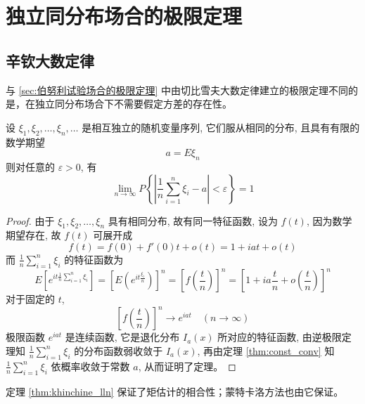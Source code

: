 \section{独立同分布场合的极限定理}\label{sec:独立同分布场合的极限定理}
\subsection{辛钦大数定律}\label{subsec:辛钦大数定律}
与 \ref{sec:伯努利试验场合的极限定理} 中由切比雪夫大数定律建立的极限定理不同的是，在独立同分布场合下不需要假定方差的存在性。
\begin{theorem} \label{thm:khinchine_lln}
 设 $\xi_1, \xi_2, \ldots, \xi_n, \ldots$ 是相互独立的随机变量序列, 它们服从相同的分布, 且具有有限的数学期望
\[
a = E\xi_n
\]
则对任意的 $\varepsilon>0$, 有
\begin{equation} \label{eq:khinchine_lln_formula}
\lim_{n\to\infty} P\left\{ \left|\frac{1}{n}\sum_{i=1}^n \xi_i - a \right| < \varepsilon \right\} = 1
\end{equation}
\end{theorem}

\begin{proof}
由于 $\xi_1, \xi_2, \ldots, \xi_n$ 具有相同分布, 故有同一特征函数, 设为 $f(t)$, 因为数学期望存在, 故 $f(t)$ 可展开成
\begin{equation} \label{eq:char_func_expansion}
f(t) = f(0) + f'(0)t + o(t) = 1 + iat + o(t)
\end{equation}
而 $\frac{1}{n}\sum_{i=1}^n \xi_i$ 的特征函数为
\begin{equation} \label{eq:sum_char_func}
E\left[e^{it\frac{1}{n}\sum_{i=1}^n \xi_i}\right] = \left[E\left(e^{it\frac{\xi_i}{n}}\right)\right]^n = \left[f\left(\frac{t}{n}\right)\right]^n = \left[1 + ia\frac{t}{n} + o\left(\frac{t}{n}\right)\right]^n
\end{equation}
对于固定的 $t$,
\begin{equation} \label{eq:char_func_limit}
\left[f\left(\frac{t}{n}\right)\right]^n \to e^{iat} \quad (n \to \infty)
\end{equation}
极限函数 $e^{iat}$ 是连续函数, 它是退化分布 $I_a(x)$ 所对应的特征函数, 由逆极限定理知 $\frac{1}{n}\sum_{i=1}^n \xi_i$ 的分布函数弱收敛于 $I_a(x)$, 再由定理 \ref{thm:const_conv} 知 $\frac{1}{n}\sum_{i=1}^n \xi_i$ 依概率收敛于常数 $a$, 从而证明了定理。
\end{proof}

\begin{remark}
    定理 \ref{thm:khinchine_lln} 保证了矩估计的相合性；蒙特卡洛方法也由它保证。
\end{remark}

